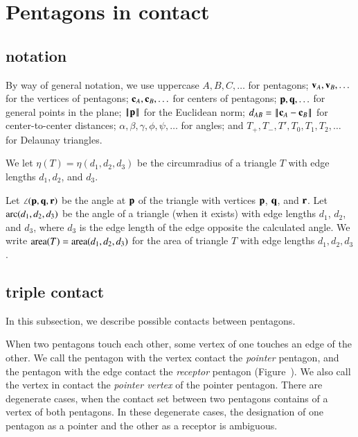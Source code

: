 \section{Pentagons in contact}


\subsection{notation}

By way of general notation, we use uppercase $A,B,C,\ldots$ for
pentagons; ${\mathbf v}_A,{\mathbf v}_B,\ldots$ for the vertices of pentagons;
${\mathbf c}_A,{\mathbf c}_B,\ldots$ for centers of pentagons; ${\mathbf p},{\mathbf q},\ldots$ for
general points in the plane; ${\hbox{\ensuremath{\hspace{0.1em}|\hspace{-0.1em}|\hspace{0.1em}}}{\mathbf p}\hbox{\ensuremath{\hspace{0.1em}|\hspace{-0.1em}|\hspace{0.1em}}}}$ for the Euclidean norm;
$\dx{AB}=\dd{A}{B}$ for center-to-center distances;
$\alpha,\beta,\gamma,\phi,\psi,\ldots$ for angles; and
$T_+,T_-,T',T_0,T_1,T_2,\ldots$ for Delaunay triangles.

We let $\eta(T) = \eta(d_1,d_2,d_3)$ be the circumradius of a triangle
$T$ with edge lengths $d_1,d_2$, and $d_3$.

Let $\angle({\mathbf p},{\mathbf q},{\mathbf r})$ be the angle at ${\mathbf p}$ of the triangle with
vertices ${\mathbf p}$, ${\mathbf q}$, and ${\mathbf r}$.  Let $\operatorname{arc}(d_1,d_2,d_3)$ be the angle
of a triangle (when it exists) with edge lengths $d_1$, $d_2$, and
$d_3$, where $d_3$ is the edge length of the edge opposite the
calculated angle.  We write ${\operatorname{area}}(T)= {\operatorname{area}}(d_1,d_2,d_3)$ for the
area of triangle $T$ with edge lengths $d_1,d_2,d_3$.


\subsection{triple contact}

In this subsection, we describe possible contacts between pentagons.

When two pentagons touch each other, some vertex of one touches an
edge of the other.  We call the pentagon with the vertex contact the
{\it pointer} pentagon, and the pentagon with the edge contact the
{\it receptor} pentagon (Figure~).  We also call the
vertex in contact the {\it pointer vertex} of the pointer pentagon. There are
degenerate cases, when the contact set between two pentagons contains
of a vertex of both pentagons.  In these degenerate cases, the
designation of one pentagon as a pointer and the other as a receptor
is ambiguous.



